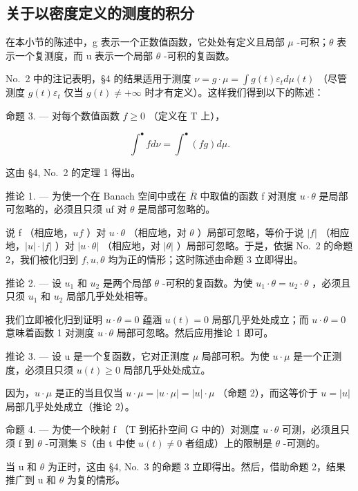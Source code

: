 \subsection{关于以密度定义的测度的积分}

在本小节的陈述中，g 表示一个正数值函数，它处处有定义且局部 \(\mu\) -可积；\(\theta\) 表示一个复测度，而 u 表示一个局部 \(\theta\) -可积的复函数。

No.~2 中的注记表明，§4 的结果适用于测度 \(\nu = g \cdot \mu = \int g(t)\varepsilon_t d\mu(t)\) （尽管测度 \(g(t)\varepsilon_t\) 仅当 \(g(t) \neq +\infty\) 时才有定义）。这样我们得到以下的陈述：

命题 3. --- 对每个数值函数 \(f \geqslant 0\) （定义在 T 上），

\[
\int^ {\bullet} f d \nu = \int^ {\bullet} (f g) d \mu .\tag{5}
\]

这由 §4, No.~2 的定理 1 得出。

推论 1. --- 为使一个在 Banach 空间中或在 \(\overline{R}\) 中取值的函数 f 对测度 \(u \cdot \theta\) 是局部可忽略的，必须且只须 uf 对 \(\theta\) 是局部可忽略的。

说 f （相应地，\(uf\) ）对 \(u \cdot \theta\) （相应地，对 \(\theta\) ）局部可忽略，等价于说 \(|f|\) （相应地，\(|u| \cdot |f|\) ）对 \(|u \cdot \theta|\) （相应地，对 \(|\theta|\) ）局部可忽略。于是，依据 No.~2 的命题 2，我们被化归到 \(f, u, \theta\) 均为正的情形；这时陈述由命题 3 立即得出。

推论 2. --- 设 \(u_1\) 和 \(u_2\) 是两个局部 \(\theta\) -可积的复函数。为使 \(u_1 \cdot \theta = u_2 \cdot \theta\) ，必须且只须 \(u_1\) 和 \(u_2\) 局部几乎处处相等。

我们立即被化归到证明 \(u \cdot \theta = 0\) 蕴涵 \(u(t) = 0\) 局部几乎处处成立；而 \(u \cdot \theta = 0\) 意味着函数 1 对测度 \(u \cdot \theta\) 局部可忽略。然后应用推论 1 即可。

推论 3. --- 设 u 是一个复函数，它对正测度 \(\mu\) 局部可积。为使 \(u \cdot \mu\) 是一个正测度，必须且只须 \(u(t) \geqslant 0\) 局部几乎处处成立。

因为，\(u \cdot \mu\) 是正的当且仅当 \(u \cdot \mu = |u \cdot \mu| = |u| \cdot \mu\) （命题 2），而这等价于 \(u = |u|\) 局部几乎处处成立（推论 2）。

命题 4. --- 为使一个映射 f （T 到拓扑空间 G 中的）对测度 \(u \cdot \theta\) 可测，必须且只须 f 到 \(\theta\) -可测集 S（由 t 中使 \(u(t) \neq 0\) 者组成）上的限制是 \(\theta\) -可测的。

当 u 和 \(\theta\) 为正时，这由 §4, No.~3 的命题 3 立即得出。然后，借助命题 2，结果推广到 u 和 \(\theta\) 为复的情形。

